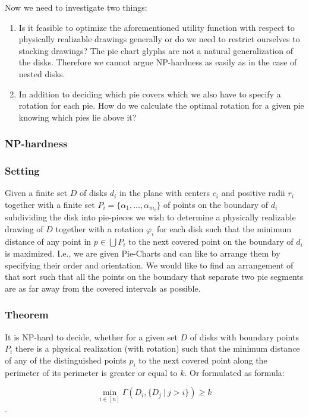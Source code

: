 \documentclass[a4paper,11pt]{article}
\begin{document}
Now we need to investigate two things:

\begin{enumerate}
  \item Is it feasible to optimize the aforementioned utility function with respect to physically realizable drawings generally or do we need to restrict ourselves to stacking drawings? The pie chart glyphs are not a natural generalization of the disks. Therefore we cannot argue NP-hardness as easily as in the case of nested disks.
  \item In addition to deciding which pie covers which we also have to specify a rotation for each pie. How do we calculate the optimal rotation for a given pie knowing which pies lie above it?
\end{enumerate}

\subsubsection{NP-hardness}

\subsubsection*{Setting}
Given a finite set $D$ of disks $d_i$ in the plane with centers $c_i$ and positive radii $r_i$ together with a finite set $P_i = \{ \alpha_1, \dots, \alpha_{m_i}\}$ of points on the boundary of $d_i$ subdividing the disk into pie-pieces we wish to determine a physically realizable drawing of $D$ together with a rotation $\varphi_i$ for each disk such that the minimum distance of any point in $p\in\bigcup P_i$ to the next covered point on the boundary of $d_i$ is maximized.
I.e., we are given Pie-Charts and can like to arrange them by specifying their order and orientation. We would like to find an arrangement of that sort such that all the points on the boundary that separate two pie segments are as far away from the covered intervals as possible.
\subsubsection*{Theorem}
It is NP-hard to decide, whether for a given set $D$ of disks with boundary points $P_i$ there is a physical realization (with rotation) such that the minimum distance of any of the distinguished points $p_i$ to the next covered point along the perimeter of its perimeter is greater or equal to $k$. Or formulated as formula:

\[\min_{i\in [n]} \Gamma(D_i,\{D_j\ |\ j>i\}) \geq k\].
\end{document}
